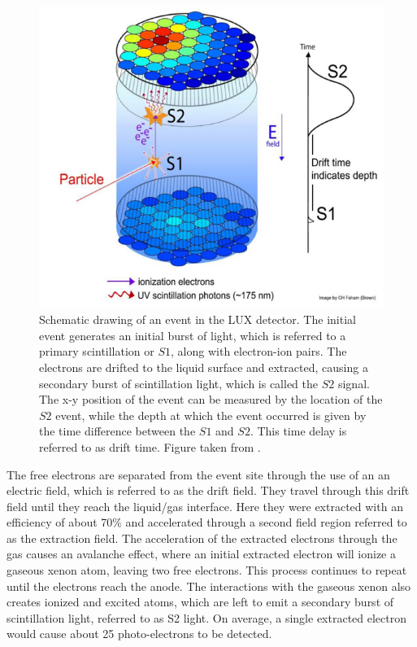 \begin{figure}[!h]
\centering
\includegraphics[width=150mm]{Figures/luxevent.png}
\caption{Schematic drawing of an event in the LUX detector. The initial event generates an initial burst of light, which is referred to a primary scintillation or $S1$, along with electron-ion pairs. The electrons are drifted to the liquid surface and extracted, causing a secondary burst of scintillation light, which is called the $S2$ signal. The x-y position of the event can be measured by the location of the $S2$ event, while the depth at which the event occurred is given by the time difference between the $S1$ and $S2$. This time delay is referred to as drift time. Figure taken from \cite{lux2012}.}
\label{fig:lux} 
\end{figure}

The free electrons are separated from the event site through the use of an an electric field, which is referred to as the drift field. They travel through this drift field until they reach the liquid/gas interface. Here they were extracted with an efficiency of about 70\% and accelerated through a second field region referred to as the extraction field. The acceleration of the extracted electrons through the gas causes an avalanche effect, where an initial extracted electron will ionize a gaseous xenon atom, leaving two free electrons. This process continues to repeat until the electrons reach the anode. The interactions with the gaseous xenon also creates ionized and excited atoms, which are left to emit a secondary burst of scintillation light, referred to as S2 light. On average, a single extracted electron would cause about 25 photo-electrons to be detected.

